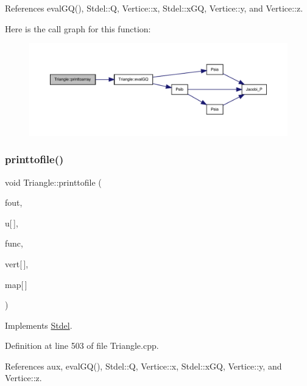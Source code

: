 References eval\+G\+Q(), Stdel\+::Q, Vertice\+::x, Stdel\+::x\+GQ, Vertice\+::y, and Vertice\+::z.

Here is the call graph for this function\+:
\nopagebreak
\begin{figure}[H]
\begin{center}
\leavevmode
\includegraphics[width=350pt]{classTriangle_a1a32c77e254ebee6c225720d99e8ef12_cgraph}
\end{center}
\end{figure}
\mbox{\label{classTriangle_a404774b49104b12d072c9c103f9c357c}} 
\subsubsection{\texorpdfstring{printtofile()}{printtofile()}\hspace{0.1cm}{\footnotesize\ttfamily [1/2]}}
{\footnotesize\ttfamily void Triangle\+::printtofile (\begin{DoxyParamCaption}\item[{F\+I\+LE $\ast$}]{fout,  }\item[{const double}]{u\mbox{[}$\,$\mbox{]},  }\item[{double($\ast$)(double, double, double)}]{func,  }\item[{const \hyperlink{structVertice}{Vertice}}]{vert\mbox{[}$\,$\mbox{]},  }\item[{const int}]{map\mbox{[}$\,$\mbox{]} }\end{DoxyParamCaption})\hspace{0.3cm}{\ttfamily [virtual]}}



Implements \hyperlink{classStdel_a315869f4c1fe1fdf4911c0d4ab092176}{Stdel}.



Definition at line 503 of file Triangle.\+cpp.



References aux, eval\+G\+Q(), Stdel\+::Q, Vertice\+::x, Stdel\+::x\+GQ, Vertice\+::y, and Vertice\+::z.

